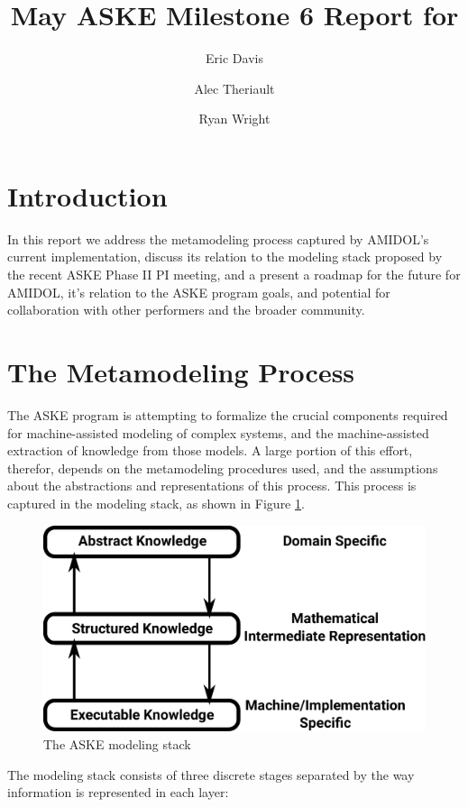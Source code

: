 \documentclass[11pt]{article}
\date{\vspace{-5ex}}
\author[1]{Eric Davis}
\author[1]{Alec Theriault}
\author[1]{Ryan Wright}
\affil[1]{Galois, Inc}
\title{May ASKE Milestone 6 Report for \amidol{}}
\newcommand{\amidol}{\textsc{AMIDOL}}
\begin{document}
\maketitle
\vspace{10pt}

\section{Introduction}

In this report we address the metamodeling process captured by
\amidol{}'s current implementation, discuss its relation to the
modeling stack proposed by the recent ASKE Phase II PI meeting, and a
present a roadmap for the future for \amidol{}, it's relation to the
ASKE program goals, and potential for collaboration with other
performers and the broader community.

\section{The Metamodeling Process}

The ASKE program is attempting to formalize the crucial components
required for machine-assisted modeling of complex systems, and the
machine-assisted extraction of knowledge from those models.  A large
portion of this effort, therefor, depends on the metamodeling
procedures used, and the assumptions about the abstractions and
representations of this process.  This process is captured in the
modeling stack, as shown in Figure \ref{Fig:Stack1}.

\begin{figure}
  \includegraphics[width=\textwidth]{figs/stack-diagram-1.pdf}
  \caption{The ASKE modeling stack}
  \label{Fig:Stack1}
\end{figure}

The modeling stack consists of three discrete stages separated by the
way information is represented in each layer:
\end{document}
